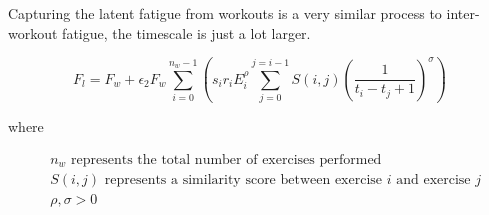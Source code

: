 Capturing the latent fatigue from workouts is a very similar process to inter-workout fatigue, the timescale is just a lot larger.

\begin{minipage}{\textwidth}
	\begin{equation*}
		F_l =
			F_{w} + 
			\epsilon_2 F_w
			\sum_{i=0}^{n_w-1} \left( 
				s_i r_i E_i^\rho
				\sum_{j=0}^{j=i-1} S(i,j)\left(
					\frac{1}{t_i-t_j+1}
				\right)^\sigma
			\right)
	\end{equation*}
	\centerline{where}
	\begin{equation*}
		\begin{split}
			& n_w \text{ represents the total number of exercises performed} \\
			& S(i,j) \text{ represents a similarity score between exercise }i \text{ and exercise }j \\
			& \rho, \sigma >0
		\end{split}
	\end{equation*}
\end{minipage}\\


